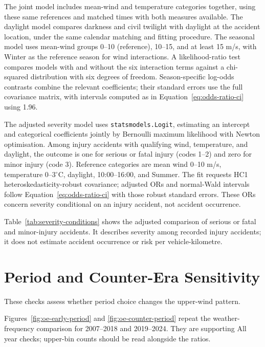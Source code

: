 The joint model includes mean-wind and temperature categories together, using
these same references and matched times with both measures available. The
daylight model compares darkness and civil twilight with daylight at the
accident location, under the same calendar matching and fitting procedure.
The seasonal model uses mean-wind groups 0--10 (reference), 10--15, and at least
15 m/s, with Winter as the reference season for wind interactions. A
likelihood-ratio test compares models with and without the six interaction
terms against a chi-squared distribution with six degrees of freedom.
Season-specific log-odds contrasts combine the relevant coefficients; their
standard errors use the full covariance matrix, with intervals computed as in
Equation~\ref{eq:odds-ratio-ci} using 1.96.

The adjusted severity model uses \texttt{statsmodels.Logit}, estimating an
intercept and categorical coefficients jointly by Bernoulli maximum
likelihood with Newton optimisation. Among injury accidents with qualifying
wind, temperature, and daylight, the outcome is one for serious or fatal
injury (codes 1--2) and zero for minor injury (code 3). Reference categories
are mean wind 0--10 m/s, temperature 0--3\(^{\circ}\)C, daylight, 10:00--16:00,
and Summer. The fit requests HC1 heteroskedasticity-robust covariance;
adjusted ORs and normal-Wald intervals follow
Equation~\ref{eq:odds-ratio-ci} with those robust standard errors.
These ORs concern severity conditional on an injury accident, not accident
occurrence.

Table~\ref{tab:severity-conditions} shows the adjusted comparison of
serious or fatal and minor-injury accidents. It describes severity among
recorded injury accidents; it does not estimate accident occurrence or risk
per vehicle-kilometre.



\clearpage
\section{Period and Counter-Era Sensitivity}
\label{app:period-sensitivity}

These checks assess whether period choice changes the upper-wind pattern.

Figures~\ref{fig:oe-early-period} and \ref{fig:oe-counter-period} repeat the
weather-frequency comparison for 2007--2018 and 2019--2024. They are supporting
All year checks; upper-bin counts should be read alongside the ratios.

